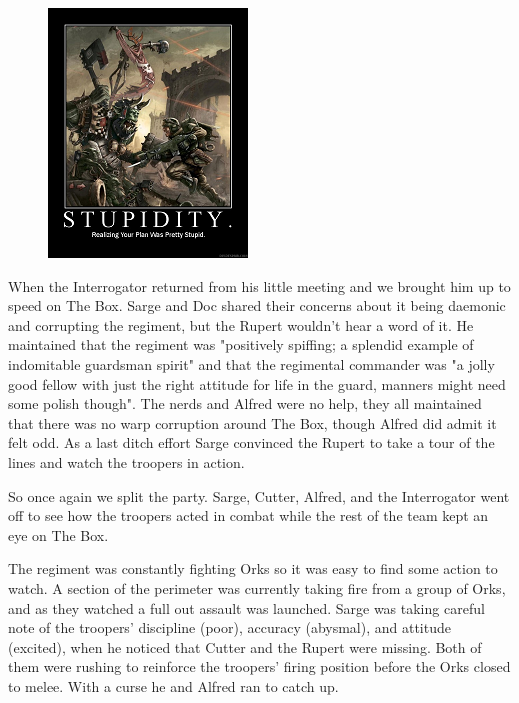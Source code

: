 \begin{figure}
	\begin{center}
		\includegraphics[width=\figwidth]{pics/4/20.png}
	\end{center}
\end{figure}
When the Interrogator returned from his little meeting and we brought him up to speed on The Box. 
Sarge and Doc shared their concerns about it being daemonic and corrupting the regiment, but the Rupert wouldn't hear a word of it. 
He maintained that the regiment was "positively spiffing; 
a splendid example of indomitable guardsman spirit" and that the regimental commander was "a jolly good fellow with just the right attitude for life in the guard, manners might need some polish though". 
The nerds and Alfred were no help, they all maintained that there was no warp corruption around The Box, though Alfred did admit it felt odd. As a last ditch effort Sarge convinced the Rupert to take a tour of the lines and watch the troopers in action.

So once again we split the party. 
Sarge, Cutter, Alfred, and the Interrogator went off to see how the troopers acted in combat while the rest of the team kept an eye on The Box.

The regiment was constantly fighting Orks so it was easy to find some action to watch. 
A section of the perimeter was currently taking fire from a group of Orks, and as they watched a full out assault was launched. 
Sarge was taking careful note of the troopers' discipline (poor), accuracy (abysmal), and attitude (excited), when he noticed that Cutter and the Rupert were missing. 
Both of them were rushing to reinforce the troopers' firing position before the Orks closed to melee. With a curse he and Alfred ran to catch up.

